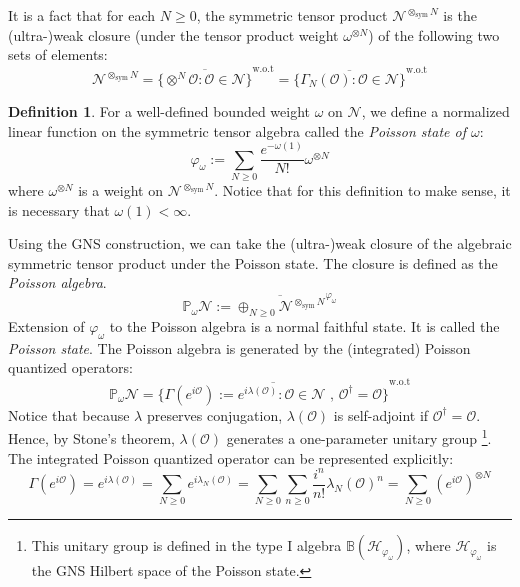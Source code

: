 \documentclass[a4paper,11pt]{article}
\theoremstyle{definition}
\newtheorem{definition}{Definition}[section]
\numberwithin{equation}{section}
\newcommand{\mN}{\mathcal{N}}
\begin{document}
It is a fact that for each $N\geq 0$, the symmetric tensor product $\mathcal{N}^{\otimes_\text{sym} N}$ is the (ultra-)weak closure (under the tensor product weight $\omega^{\otimes N}$) of the following two sets of elements:
\begin{equation}
    \mathcal{N}^{\otimes_\text{sym} N} = \overline{\{\otimes^N \mathcal{O}: \mathcal{O}\in\mathcal{N}\}}^\text{w.o.t} = \overline{\{\Gamma_N(\mathcal{O}):\mathcal{O}\in\mathcal{N}\}}^\text{w.o.t}
\end{equation}
\begin{definition}
For a well-defined bounded weight $\omega$ on $\mN$, we define a normalized linear function on the symmetric tensor algebra called the {\it Poisson state of $\omega$}:
\begin{equation}
    \varphi_\omega := \sum_{N\geq 0}\frac{e^{-\omega(1)}}{N!}\omega^{\otimes N}
\end{equation}
where $\omega^{\otimes N}$ is a weight on $\mathcal{N}^{\otimes_\text{sym} N}$. Notice that for this definition to make sense, it is necessary that $\omega(1) < \infty$. 
\end{definition}
Using the GNS construction, we can take the (ultra-)weak closure of the algebraic symmetric tensor product under the Poisson state. The closure is defined as the \textit{Poisson algebra}.
\begin{equation}
    \mathbb{P}_\omega\mathcal{N} := \overline{\oplus_{N\geq 0}\mathcal{N}^{\otimes_\text{sym} N}}^{\varphi_\omega}
\end{equation}
Extension of $\varphi_\omega$ to the Poisson algebra is a normal faithful state. It is called the \textit{Poisson state}. The Poisson algebra is generated by the (integrated) Poisson quantized operators:
\begin{equation}
    \mathbb{P}_\omega\mathcal{N} = \overline{\{\Gamma(e^{i\mathcal{O}}):=e^{i\lambda(\mathcal{O})}:\mathcal{O}\in\mathcal{N}\text{ , }\mathcal{O}^\dagger = \mathcal{O}\}}^\text{w.o.t}
\end{equation}
Notice that because $\lambda$ preserves conjugation, $\lambda(\mathcal{O})$ is self-adjoint if $\mathcal{O}^\dagger = \mathcal{O}$. Hence, by Stone's theorem, $\lambda(\mathcal{O})$ generates a one-parameter unitary group \footnote{This unitary group is defined in the type I algebra $\mathbb{B}(\mathcal{H}_{\varphi_\omega})$, where $\mathcal{H}_{\varphi_\omega}$ is the GNS Hilbert space of the Poisson state.}. The integrated Poisson quantized operator can be represented explicitly:
\begin{equation}
    \Gamma(e^{i\mathcal{O}}) = e^{i\lambda(\mathcal{O})} = \sum_{N\geq 0}e^{i\lambda_N(\mathcal{O})} = \sum_{N\geq 0}\sum_{n\geq 0}\frac{i^n}{n!}\lambda_N(\mathcal{O})^n = \sum_{N \geq 0}(e^{i\mathcal{O}})^{\otimes N}
\end{equation}
\end{document}
